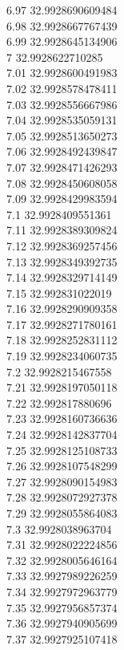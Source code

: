 {6.97	32.9928690609484\\
6.98	32.9928667767439\\
6.99	32.9928645134906\\
7	32.9928622710285\\
7.01	32.9928600491983\\
7.02	32.9928578478411\\
7.03	32.9928556667986\\
7.04	32.9928535059131\\
7.05	32.9928513650273\\
7.06	32.9928492439847\\
7.07	32.9928471426293\\
7.08	32.9928450608058\\
7.09	32.9928429983594\\
7.1	32.9928409551361\\
7.11	32.9928389309824\\
7.12	32.9928369257456\\
7.13	32.9928349392735\\
7.14	32.9928329714149\\
7.15	32.992831022019\\
7.16	32.9928290909358\\
7.17	32.9928271780161\\
7.18	32.9928252831112\\
7.19	32.9928234060735\\
7.2	32.9928215467558\\
7.21	32.9928197050118\\
7.22	32.992817880696\\
7.23	32.9928160736636\\
7.24	32.9928142837704\\
7.25	32.9928125108733\\
7.26	32.9928107548299\\
7.27	32.9928090154983\\
7.28	32.9928072927378\\
7.29	32.9928055864083\\
7.3	32.9928038963704\\
7.31	32.9928022224856\\
7.32	32.9928005646164\\
7.33	32.9927989226259\\
7.34	32.9927972963779\\
7.35	32.9927956857374\\
7.36	32.9927940905699\\
7.37	32.9927925107418\\
}
